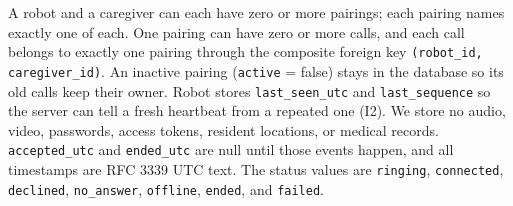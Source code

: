 \documentclass[12pt,letterpaper]{article}
\newcommand{\field}[1]{\texttt{#1}}
\begin{document}
A robot and a caregiver can each have zero or more pairings; each pairing names exactly one of each. One pairing can have zero or more calls, and each call belongs to exactly one pairing through the composite foreign key \field{(robot\_id, caregiver\_id)}. An inactive pairing (\field{active} = false) stays in the database so its old calls keep their owner. Robot stores \field{last\_seen\_utc} and \field{last\_sequence} so the server can tell a fresh heartbeat from a repeated one (I2). We store no audio, video, passwords, access tokens, resident locations, or medical records. \field{accepted\_utc} and \field{ended\_utc} are null until those events happen, and all timestamps are RFC 3339 UTC text. The status values are \field{ringing}, \field{connected}, \field{declined}, \field{no\_answer}, \field{offline}, \field{ended}, and \field{failed}.
\end{document}
